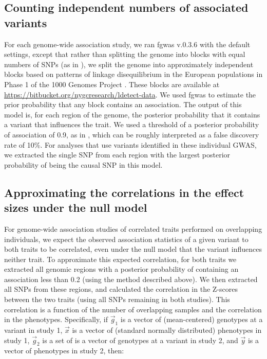 \documentclass[11pt,titlepage]{article}
\begin{document}
\subsection{Counting independent numbers of associated variants}
For each genome-wide association study, we ran fgwas v.0.3.6 \citep{pickrell2013joint} with the default settings, except that rather than splitting the genome into blocks with equal numbers of SNPs (as in \citet{pickrell2013joint}), we split the genome into approximately independent blocks based on patterns of linkage disequilibrium in the European populations in Phase 1 of the 1000 Genomes Project \citep{berisa2015approximately}. These blocks are available at \url{https://bitbucket.org/nygcresearch/ldetect-data}. We used fgwas to estimate the prior probability that any block contains an association. The output of this model is, for each region of the genome, the posterior probability that it contains a variant that influences the trait. We used a threshold of a posterior probability of association of 0.9, as in \citet{pickrell2013joint}, which can be roughly interpreted as a false discovery rate of 10\%. For analyses that use variants identified in these individual GWAS, we extracted the single SNP from each region with the largest posterior probability of being the causal SNP in this model. 

\subsection{Approximating the correlations in the effect sizes under the null model} \label{cor}
For genome-wide association studies of correlated traits performed on overlapping individuals, we expect the observed association statistics of a given variant to both traits to be correlated, even under the null model that the variant influences neither trait. To approximate this expected correlation, for both traits we extracted all genomic regions with a posterior probability of containing an association less than 0.2 (using the method described above). We then extracted all SNPs from these regions, and calculated the correlation in the Z-scores between the two traits (using all SNPs remaining in both studies). This correlation is a function of the number of overlapping samples and the correlation in the phenotypes. Specifically, if $\vec g_1$ is a vector of (mean-centered) genotypes at a variant in study 1, $\vec x$ is a vector of (standard normally distributed) phenotypes in study 1, $\vec g_2$ is a set of is a vector of genotypes at a variant in study 2, and $\vec y$ is a vector of phenotypes in study 2, then: 
\end{document}
